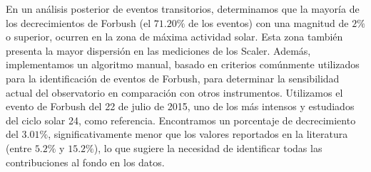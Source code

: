 {En un análisis posterior de eventos transitorios, determinamos que la mayoría de los decrecimientos de Forbush (el $71.20\%$ de los eventos) con una magnitud de $2\%$ o superior, ocurren en la zona de máxima actividad solar. Esta zona también presenta la mayor dispersión en las mediciones de los Scaler.
Además, implementamos un algoritmo manual, basado en criterios comúnmente utilizados para la identificación de eventos de Forbush, para determinar la sensibilidad actual del observatorio en comparación con otros instrumentos. Utilizamos el evento de Forbush del 22 de julio de 2015, uno de los más intensos y estudiados del ciclo solar 24, como referencia. Encontramos un porcentaje de decrecimiento del $3.01\%$, significativamente menor que los valores reportados en la literatura (entre $5.2\%$ y $15.2\%$), lo que sugiere la necesidad de identificar todas las contribuciones al fondo en los datos.

}\normalsize
\clearpage